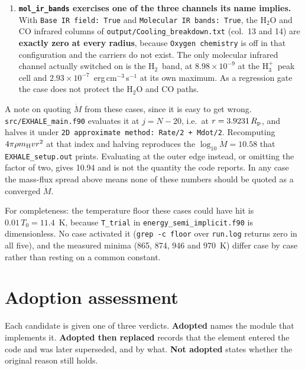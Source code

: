 \documentclass[english,a4paper]{my_memo}
\newcommand{\Rp}{R_{\rm p}}
\newcommand{\Mdot}{\dot{M}}
\newcommand{\Hth}{\ensuremath{\mathrm{H}_3^+}}
\newcommand{\Htwo}{\ensuremath{\mathrm{H}_2}}
\begin{document}
\begin{enumerate}[nosep,leftmargin=*]
{    the photon budget; the band transmission is floored at zero and this column
    is outside the fit.}'' The band is 101\,\% removed and the transmission
    floors at zero. This is the same case as item~2; no connection between the
    two is asserted.
  \item \textbf{\texttt{mol\_ir\_bands} exercises one of the three channels its
    name implies.} With \texttt{Base IR field: True} and
    \texttt{Molecular IR bands: True}, the H$_2$O and CO infrared columns of
    \texttt{output/Cooling\_breakdown.txt} (col.\ 13 and 14) are
    \textbf{exactly zero at every radius}, because \texttt{Oxygen chemistry} is
    off in that configuration and the carriers do not exist. The only molecular
    infrared channel actually switched on is the \Htwo\ band, at
    $8.98\times10^{-9}$ at the \Hth\ peak cell and
    $2.93\times10^{-7}$~erg\,cm$^{-3}$\,s$^{-1}$ at its own maximum. As a
    regression gate the case does not protect the H$_2$O and CO paths.
\end{enumerate}

A note on quoting $\Mdot$ from these cases, since it is easy to get wrong.
\texttt{src/EXHALE\_main.f90} evaluates it at $j = N - 20$, i.e.\ at
$r = 3.9231\,\Rp$, and halves it under
\texttt{2D approximate method: Rate/2 + Mdot/2}. Recomputing
$4\pi\rho m_{\rm H} v r^2$ at that index and halving reproduces the
$\log_{10}\Mdot = 10.58$ that \texttt{EXHALE\_setup.out} prints. Evaluating at
the outer edge instead, or omitting the factor of two, gives 10.94 and is not
the quantity the code reports. In any case the mass-flux spread above means
none of these numbers should be quoted as a converged $\Mdot$.

For completeness: the temperature floor these cases could have hit is
$0.01\,T_0 = 11.4$~K, because \texttt{T\_trial} in
\texttt{energy\_semi\_implicit.f90} is dimensionless. No case activated it
(\texttt{grep -c floor} over \texttt{run.log} returns zero in all five), and
the measured minima (865, 874, 946 and 970~K) differ case by case rather
than resting on a common constant.

\section{Adoption assessment}
\label{sec:adopt}

Each candidate is given one of three verdicts. \textbf{Adopted} names the
module that implements it. \textbf{Adopted then replaced} records that the
element entered the code and was later superseded, and by what. \textbf{Not
adopted} states whether the original reason still holds.
\end{document}
